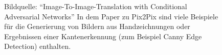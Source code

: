 \begin{figure}[h]
	\centering
	\hspace{.5cm}
	\hspace{.5cm}
	\label{fig:pix2pixexamples_1}
\end{figure}

\begin{figure}[h]
	\centering
	\hspace{.5cm}
	\hspace{.5cm}
	\caption[Bildarithmetik]{Bildquelle: ``Image-To-Image-Translation with Conditional Adversarial Networks'' \cite{isola2018imagetoimage} \newline In dem Paper zu Pix2Pix sind viele Beispiele für die Generierung von Bildern aus Handzeichnungen oder Ergebnissen einer Kantenerkennung (zum Beispiel Canny Edge Detection) enthalten.}
	\label{fig:pix2pixexamples_2}
\end{figure}

